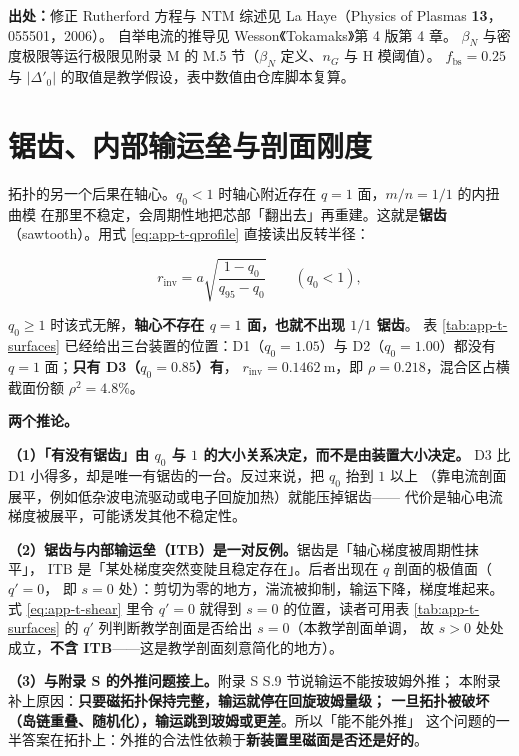 {\footnotesize
\textbf{出处：}修正 Rutherford 方程与 NTM 综述见 La Haye（Physics of Plasmas
\textbf{13}，055501，2006）。
自举电流的推导见 Wesson《Tokamaks》第 4 版第 4 章。
$\beta_N$ 与密度极限等运行极限见附录 M 的 M.5 节（$\beta_N$ 定义、$n_G$ 与 H 模阈值）。
$f_{\mathrm{bs}}=0.25$ 与 $|\Delta'_0|$ 的取值是教学假设，表中数值由仓库脚本复算。
}

\section{锯齿、内部输运垒与剖面刚度}
\label{sec:app-t-sawtooth}

拓扑的另一个后果在轴心。$q_0<1$ 时轴心附近存在 $q=1$ 面，$m/n=1/1$ 的内扭曲模
在那里不稳定，会周期性地把芯部「翻出去」再重建。这就是\textbf{锯齿}
（sawtooth）。用式 \eqref{eq:app-t-qprofile} 直接读出反转半径：

\begin{equation}
r_{\mathrm{inv}}=a\sqrt{\frac{1-q_0}{q_{95}-q_0}}
\qquad(q_0<1),
\label{eq:app-t-rinv}
\end{equation}

$q_0\ge1$ 时该式无解，\textbf{轴心不存在 $q=1$ 面，也就不出现 $1/1$ 锯齿}。
表 \ref{tab:app-t-surfaces} 已经给出三台装置的位置：D1（$q_0=1.05$）与
D2（$q_0=1.00$）都没有 $q=1$ 面；\textbf{只有 D3（$q_0=0.85$）有}，
$r_{\mathrm{inv}}=0.1462\ \mathrm{m}$，即 $\rho=0.218$，混合区占横截面份额
$\rho^2=4.8\%$。

\textbf{两个推论。}

\textbf{（1）「有没有锯齿」由 $q_0$ 与 $1$ 的大小关系决定，而不是由装置大小决定。}
D3 比 D1 小得多，却是唯一有锯齿的一台。反过来说，把 $q_0$ 抬到 $1$ 以上
（靠电流剖面展平，例如低杂波电流驱动或电子回旋加热）就能压掉锯齿——
代价是轴心电流梯度被展平，可能诱发其他不稳定性。

\textbf{（2）锯齿与内部输运垒（ITB）是一对反例。}锯齿是「轴心梯度被周期性抹平」，
ITB 是「某处梯度突然变陡且稳定存在」。后者出现在 $q$ 剖面的极值面（$q'=0$，
即 $s=0$ 处）：剪切为零的地方，湍流被抑制，输运下降，梯度堆起来。
式 \eqref{eq:app-t-shear} 里令 $q'=0$ 就得到 $s=0$ 的位置，读者可用表
\ref{tab:app-t-surfaces} 的 $q'$ 列判断教学剖面是否给出 $s=0$（本教学剖面单调，
故 $s>0$ 处处成立，\textbf{不含 ITB}——这是教学剖面刻意简化的地方）。

\textbf{（3）与附录 S 的外推问题接上。}附录 S S.9 节说输运不能按玻姆外推；
本附录补上原因：\textbf{只要磁拓扑保持完整，输运就停在回旋玻姆量级；
一旦拓扑被破坏（岛链重叠、随机化），输运跳到玻姆或更差}。所以「能不能外推」
这个问题的一半答案在拓扑上：外推的合法性依赖于\textbf{新装置里磁面是否还是好的}。

